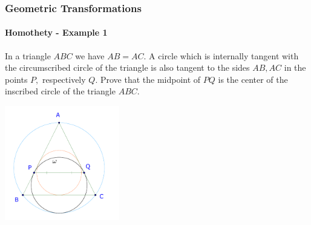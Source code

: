 \documentclass[8pt,xcolor=table,dvipsnames]{beamer}
\begin{document}
\begin{frame}[t]
    \frametitle{Geometric Transformations}
    \framesubtitle{Homothety - Example 1}
    \begin{example}
        In a triangle $ABC$ we have $AB = AC.$
        A circle which is internally tangent with the circumscribed circle of the triangle
        is also tangent to the sides $AB, AC$ in the points $P,$ respectively $Q.$
        Prove that the midpoint of $PQ$ is the center of the inscribed circle of the triangle $ABC.$
    \end{example}

    \bigbreak
    \begin{center}
        \includegraphics[width=5cm]{./svg/pdf/imo-1978-4-0.pdf}
    \end{center}
\end{frame}
\end{document}

